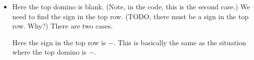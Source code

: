 \documentclass[12pt]{article}
\numberwithin{equation}{section}
\newcommand{\horizontalDominoMaybe}[3]{\filldraw [dominoMaybeStyle] (#2 - 1 + \eps, #1 - 1 + \eps) rectangle + (2 - \teps, 1 -\teps) node [dominoText] {$#3$};}
\newcommand{\verticalDominoMaybeShift}[4]{\filldraw [dominoMaybeStyle] (#2 - 1 + #4 + \eps,  #1 - 1 + \eps) rectangle + (1 - \teps,2 -\teps) node [dominoText] {$#3$};}
\begin{document}
\begin{itemize}
\begin{itemize}
\begin{itemize}
\begin{itemize}
\begin{figure}[H]
          \end{figure}
          \begin{figure}[H]
            \centering
          \end{figure}
          \item Here the top domino is blank.
          (Note, in the code, this is the second case.)
          We need to find the sign in the top row.
          (TODO, there must be a sign in the top row.  Why?)
          There are two cases.

          Here the sign in the top row is $-$. This is basically the same as the situation where the top domino is $-$.
          \begin{figure}[H]
            \centering
\end{figure}
\end{itemize}
\end{itemize}
\end{itemize}
\end{itemize}
\end{document}
